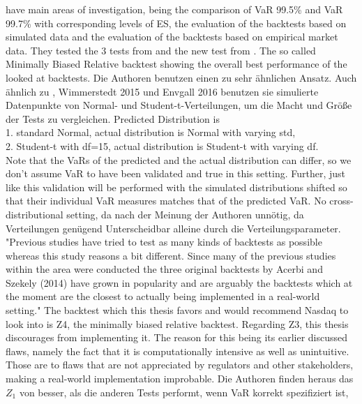 \documentclass[12pt,a4paper]{article}
\begin{document}
	\cite{berglund_backtesting_2022} have main areas of investigation, being the comparison of VaR 99.5\% and VaR 99.7\% with corresponding levels of ES, the evaluation of the backtests based on simulated data and the evaluation of the backtests based on empirical market data.
	They tested the 3 tests from \cite{acerbi_back-testing_2014} and the new test from \cite{acerbi_minimally_2019}.
	The so called Minimally Biased Relative backtest showing the overall best performance of the looked at backtests.
	Die Authoren benutzen einen zu \cite{edberg_non-parametricbacktesting_2017} sehr ähnlichen Ansatz.
	Auch ähnlich zu \cite{acerbi_back-testing_2014}, Wimmerstedt 2015 und Envgall 2016 benutzen sie simulierte Datenpunkte von Normal- und Student-t-Verteilungen, um die Macht und Größe der Tests zu vergleichen.
	Predicted Distribution is \\
	1. standard Normal, actual distribution is Normal with varying std, \\
	2. Student-t with df=15, actual distribution is Student-t with varying df. \\
	Note that the VaRs of the predicted and the actual distribution can differ, so we don't assume VaR to have been validated and true in this setting.
	Further, just like \cite{edberg_non-parametricbacktesting_2017} this validation will  be performed with the simulated distributions shifted so that their individual VaR measures matches that of the predicted VaR.
	No cross-distributional setting, da nach der Meinung der Authoren unnötig, da Verteilungen genügend Unterscheidbar alleine durch die Verteilungsparameter.
	"Previous studies have tried to test as many kinds of backtests as possible whereas this study reasons a bit different. Since many of the previous studies within the area were conducted the three original backtests by Acerbi and Szekely (2014) have grown in popularity and are arguably the backtests which at the moment are the closest to actually being implemented in a real-world setting."
	The backtest which this thesis favors and would recommend Nasdaq to look into is Z4, the minimally biased relative backtest.
	Regarding Z3, this thesis discourages from implementing it. The reason for this being its earlier discussed flaws, namely the fact that it is computationally intensive as well as unintuitive. Those are to flaws that are not appreciated by regulators and other stakeholders, making a real-world implementation improbable.
	Die Authoren finden heraus das $Z_1$ von \cite{acerbi_back-testing_2014} besser, als die anderen Tests performt, wenn VaR korrekt spezifiziert ist,
\end{document}
